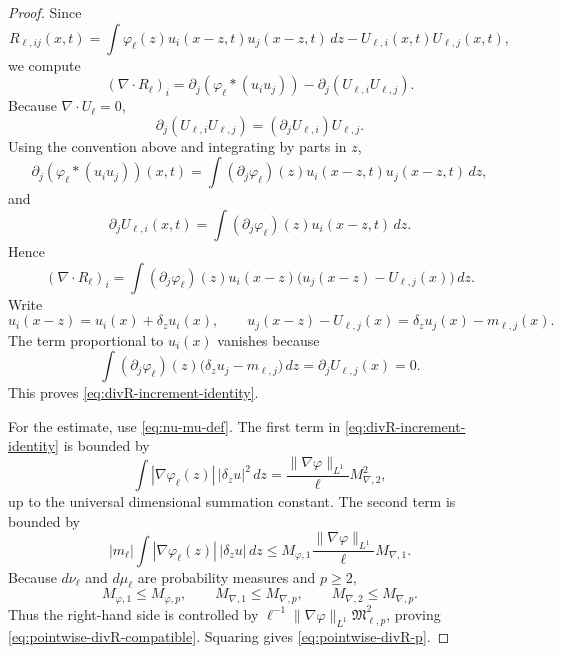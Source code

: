 \documentclass[10pt,a4paper]{amsart}
\begin{document}
\begin{proof}
Since
\[
R_{\ell,ij}(x,t)
=
\int\varphi_\ell(z)u_i(x-z,t)u_j(x-z,t)\,dz
-U_{\ell,i}(x,t)U_{\ell,j}(x,t),
\]
we compute
\[
(\nabla\!\cdot R_\ell)_i
=\partial_j(\varphi_\ell*(u_i u_j))-
\partial_j(U_{\ell,i}U_{\ell,j}).
\]
Because $\nabla\!\cdot U_\ell=0$,
\[
\partial_j(U_{\ell,i}U_{\ell,j})=(\partial_jU_{\ell,i})U_{\ell,j}.
\]
Using the convention above and integrating by parts in $z$,
\[
\partial_j(\varphi_\ell*(u_i u_j))(x,t)
=
\int(\partial_j\varphi_\ell)(z)u_i(x-z,t)u_j(x-z,t)\,dz,
\]
and
\[
\partial_jU_{\ell,i}(x,t)
=
\int(\partial_j\varphi_\ell)(z)u_i(x-z,t)\,dz.
\]
Hence
\[
(\nabla\!\cdot R_\ell)_i
=
\int(\partial_j\varphi_\ell)(z)u_i(x-z)\bigl(u_j(x-z)-U_{\ell,j}(x)\bigr)\,dz.
\]
Write
\[
u_i(x-z)=u_i(x)+\delta_z u_i(x),
\qquad
u_j(x-z)-U_{\ell,j}(x)=\delta_z u_j(x)-m_{\ell,j}(x).
\]
The term proportional to $u_i(x)$ vanishes because
\[
\int(\partial_j\varphi_\ell)(z)\bigl(\delta_z u_j-m_{\ell,j}\bigr)\,dz
=
\partial_jU_{\ell,j}(x)=0.
\]
This proves \eqref{eq:divR-increment-identity}.

For the estimate, use \eqref{eq:nu-mu-def}.  The first term in \eqref{eq:divR-increment-identity} is bounded by
\[
\int |\nabla\varphi_\ell(z)|\,|\delta_z u|^2\,dz
=
\frac{\|\nabla\varphi\|_{L^1}}{\ell}M_{\nabla,2}^2,
\]
up to the universal dimensional summation constant.  The second term is bounded by
\[
|m_\ell|\int |\nabla\varphi_\ell(z)|\,|\delta_z u|\,dz
\le
M_{\varphi,1}\frac{\|\nabla\varphi\|_{L^1}}{\ell}M_{\nabla,1}.
\]
Because $d\nu_\ell$ and $d\mu_\ell$ are probability measures and $p\ge2$,
\[
M_{\varphi,1}\le M_{\varphi,p},
\qquad
M_{\nabla,1}\le M_{\nabla,p},
\qquad
M_{\nabla,2}\le M_{\nabla,p}.
\]
Thus the right-hand side is controlled by $\ell^{-1}\|\nabla\varphi\|_{L^1}\mathfrak M_{\ell,p}^2$, proving \eqref{eq:pointwise-divR-compatible}.  Squaring gives \eqref{eq:pointwise-divR-p}.
\end{proof}
\end{document}
